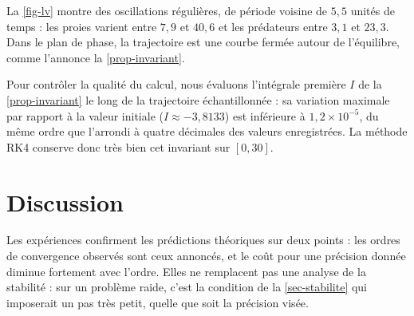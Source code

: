 La \cref{fig-lv} montre des oscillations régulières, de période voisine de $5{,}5$ unités de temps : les proies varient entre $7{,}9$ et $40{,}6$ et les prédateurs entre $3{,}1$ et $23{,}3$. Dans le plan de phase, la trajectoire est une courbe fermée autour de l'équilibre, comme l'annonce la \cref{prop-invariant}.

Pour contrôler la qualité du calcul, nous évaluons l'intégrale première $I$ de la \cref{prop-invariant} le long de la trajectoire échantillonnée : sa variation maximale par rapport à la valeur initiale ($I\approx-3{,}8133$) est inférieure à $1{,}2\times10^{-5}$, du même ordre que l'arrondi à quatre décimales des valeurs enregistrées. La méthode RK4 conserve donc très bien cet invariant sur $[0,30]$.

\section{Discussion}\label{sec-discussion}

Les expériences confirment les prédictions théoriques sur deux points : les ordres de convergence observés sont ceux annoncés, et le coût pour une précision donnée diminue fortement avec l'ordre. Elles ne remplacent pas une analyse de la stabilité : sur un problème raide, c'est la condition de la \cref{sec-stabilite} qui imposerait un pas très petit, quelle que soit la précision visée.
